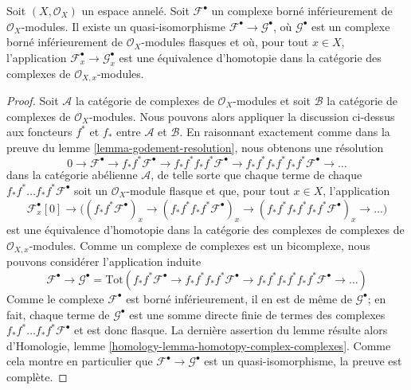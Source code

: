 \begin{lemma}

\label{lemma-godement-resolution-bounded-below}
Soit $(X, \mathcal{O}_X)$ un espace annelé. Soit $\mathcal{F}^\bullet$ un complexe borné inférieurement de $\mathcal{O}_X$-modules. Il existe un quasi-isomorphisme $\mathcal{F}^\bullet \to \mathcal{G}^\bullet$, où $\mathcal{G}^\bullet$ est un complexe borné inférieurement de $\mathcal{O}_X$-modules flasques et où, pour tout $x \in X$, l'application $\mathcal{F}^\bullet_x \to \mathcal{G}^\bullet_x$ est une équivalence d'homotopie dans la catégorie des complexes de $\mathcal{O}_{X, x}$-modules.
\end{lemma}

\begin{proof}

Soit $\mathcal{A}$ la catégorie de complexes de $\mathcal{O}_X$-modules et soit $\mathcal{B}$ la catégorie de complexes de $\mathcal{O}_X$-modules. Nous pouvons alors appliquer la discussion ci-dessus aux foncteurs
$f^*$ et $f_*$ entre $\mathcal{A}$ et $\mathcal{B}$. En raisonnant exactement comme dans la preuve du lemme \ref{lemma-godement-resolution},
nous obtenons une résolution
$$
0 \to
\mathcal{F}^\bullet \to
f_*f^*\mathcal{F}^\bullet \to
f_*f^*f_*f^*\mathcal{F}^\bullet \to
f_*f^*f_*f^*f_*f^*\mathcal{F}^\bullet \to \ldots
$$
dans la catégorie abélienne $\mathcal{A}$, de telle sorte que chaque terme de chaque
$f_*f^*\ldots f_*f^*\mathcal{F}^\bullet$ soit un
$\mathcal{O}_X$-module flasque et que, pour tout $x \in X$, l'application
$$
\mathcal{F}^\bullet_x[0] \to \Big(
(f_*f^*\mathcal{F}^\bullet)_x \to
(f_*f^*f_*f^*\mathcal{F}^\bullet)_x \to
(f_*f^*f_*f^*f_*f^*\mathcal{F}^\bullet)_x \to \ldots
\Big)
$$
est une équivalence d'homotopie dans la catégorie des complexes de complexes de $\mathcal{O}_{X, x}$-modules. Comme un complexe de complexes est un bicomplexe, nous pouvons considérer l'application induite
$$
\mathcal{F}^\bullet \to
\mathcal{G}^\bullet =
\text{Tot}(
f_*f^*\mathcal{F}^\bullet \to
f_*f^*f_*f^*\mathcal{F}^\bullet \to
f_*f^*f_*f^*f_*f^*\mathcal{F}^\bullet \to \ldots
)
$$
Comme le complexe $\mathcal{F}^\bullet$ est borné inférieurement, il en est de même de $\mathcal{G}^\bullet$; en fait, chaque terme de $\mathcal{G}^\bullet$ est une somme directe finie de termes des complexes $f_*f^*\ldots f_*f^*\mathcal{F}^\bullet$
et est donc flasque. La dernière assertion du lemme résulte alors d'Homologie, lemme \ref{homology-lemma-homotopy-complex-complexes}. Comme cela montre en particulier que
$\mathcal{F}^\bullet \to \mathcal{G}^\bullet$
est un quasi-isomorphisme, la preuve est complète.

\end{proof}
